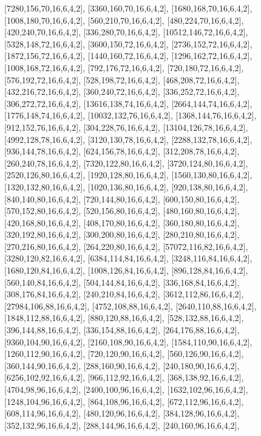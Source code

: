 \documentclass[12pt]{amsart}
\begin{document}
[7280,156,70,16,6,4,2],   [3360,160,70,16,6,4,2],   [1680,168,70,16,6,4,2],   [1008,180,70,16,6,4,2],   [560,210,70,16,6,4,2],   [480,224,70,16,6,4,2],
[420,240,70,16,6,4,2],   [336,280,70,16,6,4,2],   [10512,146,72,16,6,4,2],   [5328,148,72,16,6,4,2],   [3600,150,72,16,6,4,2],   [2736,152,72,16,6,4,2],
[1872,156,72,16,6,4,2],   [1440,160,72,16,6,4,2],   [1296,162,72,16,6,4,2],   [1008,168,72,16,6,4,2],   [792,176,72,16,6,4,2],   [720,180,72,16,6,4,2],
[576,192,72,16,6,4,2],   [528,198,72,16,6,4,2],   [468,208,72,16,6,4,2],   [432,216,72,16,6,4,2],   [360,240,72,16,6,4,2],   [336,252,72,16,6,4,2],
[306,272,72,16,6,4,2],   [13616,138,74,16,6,4,2],   [2664,144,74,16,6,4,2],   [1776,148,74,16,6,4,2],   [10032,132,76,16,6,4,2],   [1368,144,76,16,6,4,2],
[912,152,76,16,6,4,2],   [304,228,76,16,6,4,2],   [13104,126,78,16,6,4,2],   [4992,128,78,16,6,4,2],   [3120,130,78,16,6,4,2],   [2288,132,78,16,6,4,2],
[936,144,78,16,6,4,2],   [624,156,78,16,6,4,2],   [312,208,78,16,6,4,2],   [260,240,78,16,6,4,2],   [7320,122,80,16,6,4,2],   [3720,124,80,16,6,4,2],
[2520,126,80,16,6,4,2],   [1920,128,80,16,6,4,2],   [1560,130,80,16,6,4,2],   [1320,132,80,16,6,4,2],   [1020,136,80,16,6,4,2],   [920,138,80,16,6,4,2],
[840,140,80,16,6,4,2],   [720,144,80,16,6,4,2],   [600,150,80,16,6,4,2],   [570,152,80,16,6,4,2],   [520,156,80,16,6,4,2],   [480,160,80,16,6,4,2],
[420,168,80,16,6,4,2],   [408,170,80,16,6,4,2],   [360,180,80,16,6,4,2],   [320,192,80,16,6,4,2],   [300,200,80,16,6,4,2],   [280,210,80,16,6,4,2],
[270,216,80,16,6,4,2],   [264,220,80,16,6,4,2],   [57072,116,82,16,6,4,2],   [3280,120,82,16,6,4,2],   [6384,114,84,16,6,4,2],   [3248,116,84,16,6,4,2],
[1680,120,84,16,6,4,2],   [1008,126,84,16,6,4,2],   [896,128,84,16,6,4,2],   [560,140,84,16,6,4,2],   [504,144,84,16,6,4,2],   [336,168,84,16,6,4,2],
[308,176,84,16,6,4,2],   [240,210,84,16,6,4,2],   [3612,112,86,16,6,4,2],   [27984,106,88,16,6,4,2],   [4752,108,88,16,6,4,2],   [2640,110,88,16,6,4,2],
[1848,112,88,16,6,4,2],   [880,120,88,16,6,4,2],   [528,132,88,16,6,4,2],   [396,144,88,16,6,4,2],   [336,154,88,16,6,4,2],   [264,176,88,16,6,4,2],
[9360,104,90,16,6,4,2],   [2160,108,90,16,6,4,2],   [1584,110,90,16,6,4,2],   [1260,112,90,16,6,4,2],   [720,120,90,16,6,4,2],   [560,126,90,16,6,4,2],
[360,144,90,16,6,4,2],   [288,160,90,16,6,4,2],   [240,180,90,16,6,4,2],   [6256,102,92,16,6,4,2],   [966,112,92,16,6,4,2],   [368,138,92,16,6,4,2],
[4704,98,96,16,6,4,2],   [2400,100,96,16,6,4,2],   [1632,102,96,16,6,4,2],   [1248,104,96,16,6,4,2],   [864,108,96,16,6,4,2],   [672,112,96,16,6,4,2],
[608,114,96,16,6,4,2],   [480,120,96,16,6,4,2],   [384,128,96,16,6,4,2],   [352,132,96,16,6,4,2],   [288,144,96,16,6,4,2],   [240,160,96,16,6,4,2],
\end{document}
